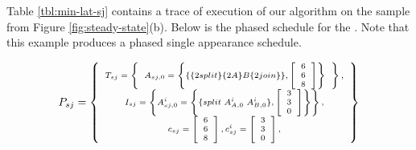 Table \ref{tbl:min-lat-sj} contains a trace of execution of our
algorithm on the sample {\splitjoin} from Figure
\ref{fig:steady-state}(b). Below is the phased schedule for the
{\splitjoin}. Note that this example produces a phased single
appearance schedule.

\begin{displaymath} \scriptsize
P_{sj} = \left\{
\begin{array}{c}
T_{sj} = \left\{
\begin{array}{c}
A_{sj,0} = \left\{ \{\{2 split\}\{2A\}B\{2 join\}\}, \left[\begin{array}{c} 6 \\ 6 \\ 8 \end{array}\right]\right\} \\
\end{array}\right\}, \\
I_{sj} = \left\{ A^i_{sj,0} = \left\{
\{split\ A^i_{A,0}\ A^i_{B,0}\}, \left[\begin{array}{c} 3 \\ 3 \\ 0 \\
\end{array}\right]\right\}
\right\}, \\
c_{sj} = \left[ \begin{array}{c} 6 \\ 6 \\ 8 \end{array} \right],
c^i_{sj} = \left[ \begin{array}{c} 3 \\ 3 \\ 0 \end{array}
\right],
\end{array}
\right\}
\end{displaymath}
